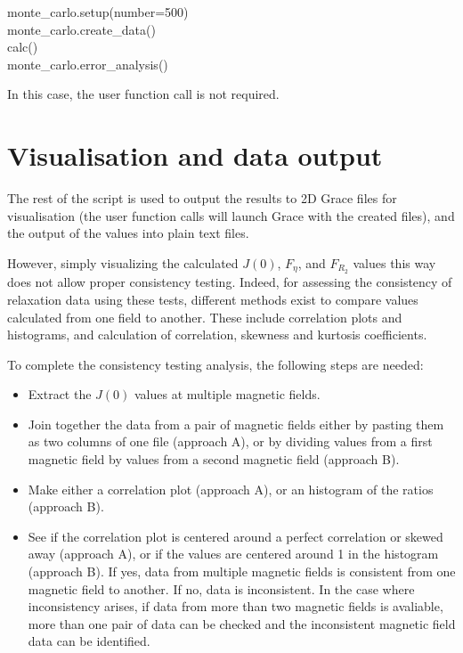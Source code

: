 \begin{exampleenv}
monte\_carlo.setup(number=500) \\
monte\_carlo.create\_data() \\
calc() \\
monte\_carlo.error\_analysis()
\end{exampleenv}

In this case, the  user function call is not required.



\section{Visualisation and data output}
\label{sec: Visualisation and data output}

The rest of the script is used to output the results to 2D Grace files for visualisation (the  user function calls will launch Grace with the created files), and the output of the values into plain text files.

However, simply visualizing the calculated $J(0)$, $F_\eta$, and $F_{R_2}$ values this way does not allow proper consistency testing. Indeed, for assessing the consistency of relaxation data using these tests, different methods exist to compare values calculated from one field to another.  These include correlation plots and histograms, and calculation of correlation, skewness and kurtosis coefficients.

To complete the consistency testing analysis, the following steps are needed:

\begin{itemize}
\item Extract the $J(0)$ values at multiple magnetic fields.
\item Join together the data from a pair of magnetic fields either by pasting them as two columns of one file (approach A), or by dividing values from a first magnetic field by values from a second magnetic field (approach B).
\item Make either a correlation plot (approach A), or an histogram of the ratios (approach B).
\item See if the correlation plot is centered around a perfect correlation or skewed away (approach A), or if the values are centered around 1 in the histogram (approach B).  If yes, data from multiple magnetic fields is consistent from one magnetic field to another.  If no, data is inconsistent.  In the case where inconsistency arises, if data from more than two magnetic fields is avaliable, more than one pair of data can be checked and the inconsistent magnetic field data can be identified.
\end{itemize}

